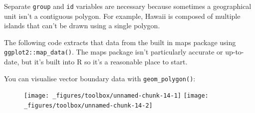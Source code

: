 Separate \texttt{group} and \texttt{id} variables are necessary because
sometimes a geographical unit isn't a contiguous polygon. For example,
Hawaii is composed of multiple islands that can't be drawn using a
single polygon.

The following code extracts that data from the built in maps package
using \texttt{ggplot2::map\_data()}. The maps package isn't particularly
accurate or up-to-date, but it's built into R so it's a reasonable place
to start. 

\begin{Shaded}
\end{Shaded}

You can visualise vector boundary data with \texttt{geom\_polygon()}:

\begin{Shaded}
\begin{Highlighting}[]
\StringTok{  }\NormalTok{(}\NormalTok{(} \StringTok{ }
\StringTok{  }\NormalTok{()}

\StringTok{  }\NormalTok{(}\NormalTok{(}  \NormalTok{, } \NormalTok{) +}\StringTok{ }
\StringTok{  }\NormalTok{()}
\end{Highlighting}
\end{Shaded}

\begin{figure}[H]
  \texttt{[image: \_figures/toolbox/unnamed-chunk-14-1]}%
  \texttt{[image: \_figures/toolbox/unnamed-chunk-14-2]}
\end{figure}

